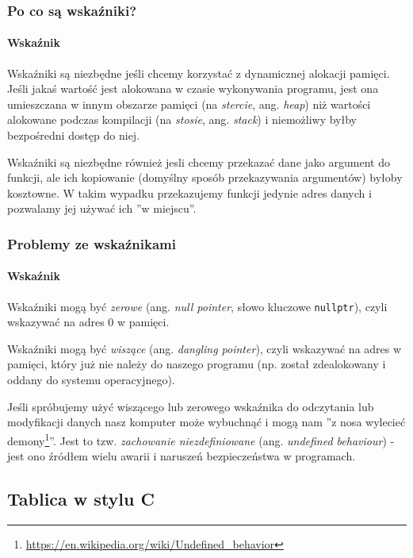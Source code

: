 \documentclass[aspectratio=169]{beamer}
\begin{document}
\begin{frame}
    \frametitle{Po co są wskaźniki?}
    \framesubtitle{Wskaźnik}

    Wskaźniki są niezbędne jeśli chcemy korzystać z dynamicznej alokacji
    pamięci. Jeśli jakaś wartość jest alokowana w czasie wykonywania programu,
    jest ona umieszczana w innym obszarze pamięci (na \emph{stercie}, ang.
    \emph{heap}) niż wartości alokowane podczas kompilacji (na \emph{stosie},
    ang. \emph{stack}) i niemożliwy byłby bezpośredni dostęp do niej.

    \vspace{1em}

    Wskaźniki są niezbędne również jesli chcemy przekazać dane jako argument do
    funkcji, ale ich kopiowanie (domyślny sposób przekazywania argumentów)
    byłoby kosztowne. W takim wypadku przekazujemy funkcji jedynie adres danych
    i pozwalamy jej używać ich ''w miejscu''.
\end{frame}

\begin{frame}
    \frametitle{Problemy ze wskaźnikami}
    \framesubtitle{Wskaźnik}
    \label{what_is_a_dangling_pointer}

    Wskaźniki mogą być \emph{zerowe} (ang. \emph{null pointer}, słowo kluczowe
    {\tt nullptr}), czyli wskazywać na adres 0 w pamięci.

    \vspace{1em}

    Wskaźniki mogą być \emph{wiszące} (ang. \emph{dangling pointer}), czyli
    wskazywać na adres w pamięci, który już nie należy do naszego programu (np.
    został zdealokowany i oddany do systemu operacyjnego).

    \vspace{1em}

    Jeśli spróbujemy użyć wiszącego lub zerowego wskaźnika do odczytania lub
    modyfikacji danych nasz komputer może wybuchnąć i mogą nam ''z nosa
    wylecieć
    demony\footnote{\url{https://en.wikipedia.org/wiki/Undefined_behavior}}''.
    Jest to tzw. \emph{zachowanie niezdefiniowane} (ang. \emph{undefined
    behaviour}) - jest ono źródłem wielu awarii i naruszeń bezpieczeństwa w
    programach.
\end{frame}

\subsection{Tablica w stylu C}
\end{document}
